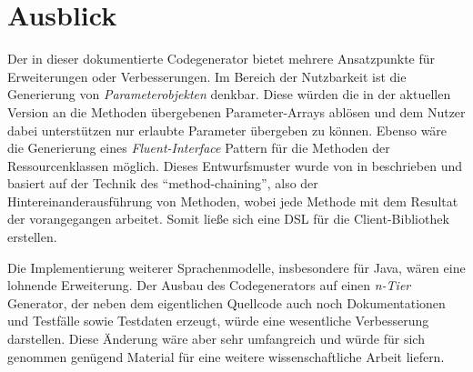 \section{Ausblick}
\label{sec:prospect}


Der in dieser \thesisDesignator{} dokumentierte Codegenerator bietet mehrere Ansatzpunkte für Erweiterungen oder Verbesserungen. Im Bereich der Nutzbarkeit ist die Generierung von \emph{Parameterobjekten} denkbar. Diese würden die in der aktuellen Version an die Methoden übergebenen Parameter-Arrays ablösen und dem Nutzer dabei unterstützen nur erlaubte Parameter übergeben zu können. Ebenso wäre die Generierung eines \emph{Fluent-Interface} Pattern für die Methoden der Ressourcenklassen möglich. Dieses Entwurfsmuster wurde von \citeauthor{fowler2010domain} in \cite{fowler2010domain} beschrieben und basiert auf der Technik des \enquote{method-chaining}, also der Hintereinanderausführung von Methoden, wobei jede Methode mit dem Resultat der vorangegangen arbeitet. Somit ließe sich eine \gls{DSL} für die Client-Bibliothek erstellen.

Die Implementierung weiterer Sprachenmodelle, insbesondere für Java, wären eine lohnende Erweiterung. Der Ausbau des Codegenerators auf einen \emph{n-Tier} Generator, der neben dem eigentlichen Quellcode auch noch Dokumentationen und Testfälle sowie Testdaten erzeugt, würde eine wesentliche Verbesserung darstellen. Diese Änderung wäre aber sehr umfangreich und würde für sich genommen genügend Material für eine weitere wissenschaftliche Arbeit liefern.

